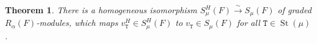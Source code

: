 \documentclass[twoside,11pt,reqno]{amsart}
\numberwithin{equation}{section}
\newtheorem{Theorem}[equation]{Theorem}
\theoremstyle{definition}  %
\newcommand{\ind}{\operatorname{ind}}
\newcommand{\cha}{\operatorname{char}}
\newcommand{\St}{\operatorname{St}}
\newcommand{\0}{{\bar 0}}
\newcommand{\1}{{\bar 1}}
\newcommand{\al}{\alpha}
\def\Si{\mathfrak{S}}
\newcommand{\si}{\sigma}
\newcommand{\D}{{\mathscr D}}
\newcommand\Par[1][]{{\mathscr P}^{\kappa#1}}
\def\T{{\mathtt T}}
\def\G{{\mathtt G}}
\def\surj{{\twoheadrightarrow}}
\def\Gar{{\operatorname{Gar}}}
\def\iso{\stackrel{\sim}{\longrightarrow}}
\begin{document}
\begin{Theorem} \label{signed TMain}%
There is a homogeneous isomorphism
$S_\mu^H(F)\iso S_\mu(F)$ of graded $R_\al(F)$-modules, which maps $v^H_\T\in
S_\mu^H(F)$ to $v_\T\in S_\mu(F)$ for all $\T\in\St(\mu)$. 
\end{Theorem}
%
%
%
\end{document}
